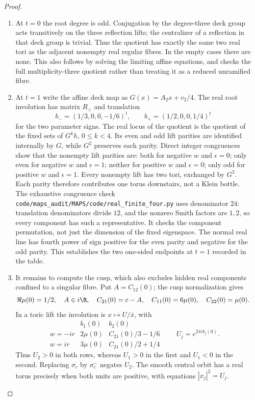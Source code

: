 \begin{proof}
\begin{enumerate}[label=\arabic*.,leftmargin=*]
\item At $t=0$ the root degree is odd. Conjugation by the degree-three deck
group acts transitively on the three reflection lifts; the centralizer
of a reflection in that deck group is trivial.
Thus the quotient has exactly the same two real tori as the adjacent
nonempty real regular fibres. In the empty cases there are none. This
also follows by solving the limiting affine equations, and checks the
full multiplicity-three quotient rather than treating it as a reduced
unramified fibre.

\item At $t=1$ write the affine deck map as
$G(x)=A_2x+v_2/4$. The real root involution has matrix $R_>$ and
translation
\[
 b_-=(1/3,0,0,-1/6)^t,
 \qquad b_+=(1/2,0,0,1/4)^t
\]
for the two parameter signs. The real locus of the quotient is the
quotient of the fixed sets of $G^kh$, $0\leq k<4$. Its even and odd
lift parities are identified internally by $G$, while $G^2$ preserves
each parity. Direct integer congruences show that the nonempty lift
parities are: both for negative $w$ and $\epsilon=0$; only even for
negative $w$ and $\epsilon=1$; neither for positive $w$ and $\epsilon=0$;
only odd for positive $w$ and $\epsilon=1$. Every nonempty lift has
two tori, exchanged by $G^2$. Each parity therefore contributes one
torus downstairs, not a Klein bottle. The exhaustive congruence check
\texttt{code/maps\_audit/MAPS/code/real\_finite\_four.py} uses denominator $24$: translation
denominators divide $12$, and the nonzero Smith factors are $1,2$, so
every component has such a representative. It checks the component
permutation, not just the dimension of the fixed eigenspace. The normal
real line has fourth power of sign positive for the even parity and
negative for the odd parity. This establishes the two one-sided
endpoints at $t=1$ recorded in the table.

\item It remains to compute the cusp, which also excludes hidden real
components confined to a singular fibre. Put
$A=C_{12}(0)$; the cusp normalization gives
\[
 \Re\mu(0)=1/2,\quad A\in i\R,\quad C_{21}(0)=c-A,
 \quad C_{11}(0)=6\mu(0),\quad C_{22}(0)=\mu(0).
\]
In a toric lift the involution is
$x\mapsto U/\bar x$, with
\[
\begin{array}{c|cc}
 &b_1(0)&b_2(0)\\\hline
 w=-ir&2\mu(0)&C_{21}(0)/3-1/6\\
 w=ir&3\mu(0)&C_{21}(0)/2+1/4
\end{array}
\qquad U_j=e^{2\pi i b_j(0)}.
\label{mapsI:real-eq-7}
\]
Thus $U_2>0$ in both rows, whereas $U_1>0$ in the first and $U_1<0$
in the second. Replacing $\sigma_c$ by $\sigma_c^-$ negates $U_2$.
The smooth central orbit has a real torus precisely when both units
are positive, with equations $|x_j|^2=U_j$.


\end{enumerate}
\end{proof}
